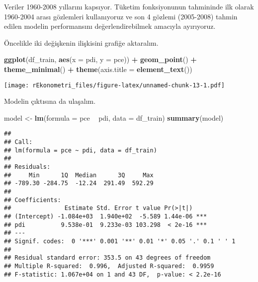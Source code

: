 \documentclass[
]{book}
\newenvironment{Shaded}{\begin{snugshade}}{\end{snugshade}}
\newcommand{\DataTypeTok}[1]{\textcolor[rgb]{0.13,0.29,0.53}{#1}}
\newcommand{\DecValTok}[1]{\textcolor[rgb]{0.00,0.00,0.81}{#1}}
\newcommand{\KeywordTok}[1]{\textcolor[rgb]{0.13,0.29,0.53}{\textbf{#1}}}
\newcommand{\NormalTok}[1]{#1}
\newcommand{\OperatorTok}[1]{\textcolor[rgb]{0.81,0.36,0.00}{\textbf{#1}}}
\newcommand{\StringTok}[1]{\textcolor[rgb]{0.31,0.60,0.02}{#1}}
\begin{document}
Veriler 1960-2008 yıllarını kapsıyor. Tüketim fonksiyonunun tahmininde ilk olarak 1960-2004 arası gözlemleri kullanıyoruz ve son 4 gözlemi (2005-2008) tahmin edilen modelin performansını değerlendirebilmek amacıyla ayırıyoruz.

\begin{Shaded}
\end{Shaded}

Öncelikle iki değişkenin ilişkisini grafiğe aktaralım.

\begin{Shaded}
\begin{Highlighting}[]
\KeywordTok{ggplot}\NormalTok{(df_train, }\KeywordTok{aes}\NormalTok{(}\DataTypeTok{x =}\NormalTok{ pdi, }\DataTypeTok{y =}\NormalTok{ pce)) }\OperatorTok{+}
\StringTok{  }\KeywordTok{geom_point}\NormalTok{() }\OperatorTok{+}
\StringTok{  }\KeywordTok{theme_minimal}\NormalTok{() }\OperatorTok{+}
\StringTok{  }\KeywordTok{theme}\NormalTok{(}\DataTypeTok{axis.title =} \KeywordTok{element_text}\NormalTok{())}
\end{Highlighting}
\end{Shaded}

\texttt{[image: rEkonometri\_files/figure-latex/unnamed-chunk-13-1.pdf]}

Modelin çıktısına da ulaşalım.

\begin{Shaded}
\begin{Highlighting}[]
\NormalTok{model <-}\StringTok{ }\KeywordTok{lm}\NormalTok{(}\DataTypeTok{formula =}\NormalTok{ pce }\OperatorTok{~}\StringTok{ }\NormalTok{pdi, }\DataTypeTok{data =}\NormalTok{ df_train)}
\KeywordTok{summary}\NormalTok{(model)}
\end{Highlighting}
\end{Shaded}

\begin{verbatim}
## 
## Call:
## lm(formula = pce ~ pdi, data = df_train)
## 
## Residuals:
##     Min      1Q  Median      3Q     Max 
## -789.30 -284.75  -12.24  291.49  592.29 
## 
## Coefficients:
##               Estimate Std. Error t value Pr(>|t|)    
## (Intercept) -1.084e+03  1.940e+02  -5.589 1.44e-06 ***
## pdi          9.538e-01  9.233e-03 103.298  < 2e-16 ***
## ---
## Signif. codes:  0 '***' 0.001 '**' 0.01 '*' 0.05 '.' 0.1 ' ' 1
## 
## Residual standard error: 353.5 on 43 degrees of freedom
## Multiple R-squared:  0.996,  Adjusted R-squared:  0.9959 
## F-statistic: 1.067e+04 on 1 and 43 DF,  p-value: < 2.2e-16
\end{verbatim}
\end{document}
